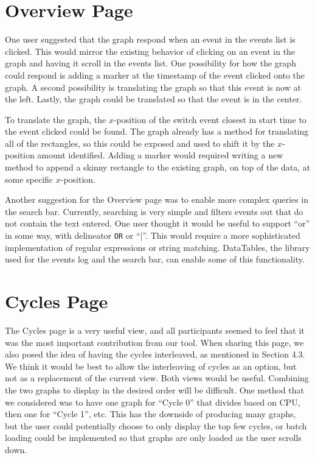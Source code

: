 \documentclass{hmcclinic}
\begin{document}
\section{Overview Page}
One user suggested that the graph respond when an event in the events list is clicked.
 This would mirror the existing behavior of clicking on an event in the graph and having
  it scroll in the events list. One possibility for how the graph could respond is adding
   a marker at the timestamp of the event clicked onto the graph. A second possibility is
    translating the graph so that this event is now at the left. Lastly, the graph could 
    be translated so that the event is in the center.

  To translate the graph, the $x$-position of the switch event closest in start time to
   the event clicked could be found. The graph already has a method for translating all
    of the rectangles, so this could be exposed and used to shift it by the $x$-position
     amount identified. Adding a marker would required writing a new method to append a
      skinny rectangle to the existing graph, on top of the data, at some
      specific $x$-position.

  Another suggestion for the Overview page was to enable more complex queries in the 
  search bar. Currently, searching is very simple and filters events out that do not 
  contain the text entered. One user thought it would be useful to support
  ``or'' in 
  some way, with delineator \texttt{OR} or ``|''. This would require a more
  sophisticated implementation 
  of regular expressions or string matching. DataTables, the library used for the 
  events log and the search bar, can enable some of this functionality.

  \section{Cycles Page}

  The Cycles page is a very useful view, and all participants seemed to feel that 
  it was the most important contribution from our tool. When sharing this page, 
  we also posed the idea of having the cycles interleaved, as mentioned in 
  Section 4.3. We think it would be best to allow the interleaving of cycles as 
  an option, but not as a replacement of the current view. Both views would be 
  useful. Combining the two graphs to display in the desired order will be 
  difficult. One method that we considered was to have one graph for ``Cycle 0''
  that divides based on CPU, then one for ``Cycle 1'', etc. This has the
  downside of producing many graphs, but the user could potentially choose to
  only display the top few cycles, or batch loading could be implemented so that
  graphs are only loaded as the user scrolls down.
\end{document}
